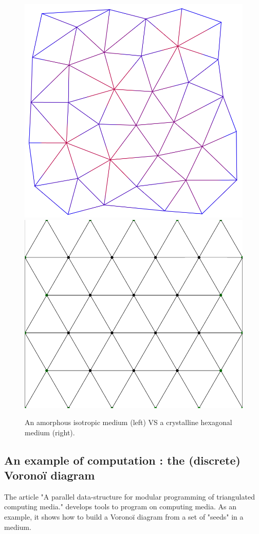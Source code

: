\documentclass{article}
\begin{document}
\begin{figure}[H]
	\centering\includegraphics[width=0.4\linewidth]{assets/amorphous_medium.png}
	\hspace{0.1\linewidth}
	\centering\includegraphics[width=0.4\linewidth]{assets/hexagonal_medium.png}
	\caption{An amorphous isotropic medium (left) VS a crystalline hexagonal medium (right).}
	\label{fig:amorphous_vs_crystaline}
\end{figure}

\subsection{An example of computation : the (discrete) Voronoï diagram}

The article "A parallel data-structure for modular programming of triangulated computing media."\cite{Voronoi} develops tools to program on computing media. As an example, it shows how to build a Voronoï diagram from a set of "seeds" in a medium.
\end{document}
